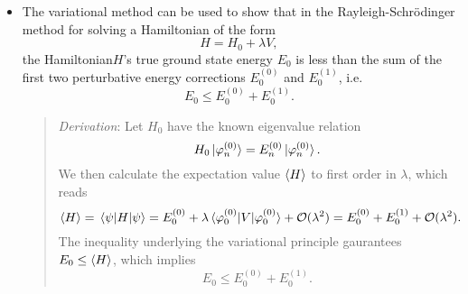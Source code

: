 \documentclass[11pt, a4paper]{article}
\newcommand{\Schro}{Schr\"{o}dinger\xspace}
\newcommand{\Ham}{Hamiltonian\xspace}
\begin{document}
\begin{itemize}
    \item The variational method can be used to show that in the Rayleigh-\Schro method for solving a \Ham of the form
    \begin{equation*}
        H = H_{0} + \lambda V,
    \end{equation*}
    the \Ham $ H $'s true ground state energy $ E_{0} $ is less than the sum of the first two perturbative energy corrections $ E_{0}^{(0)} $ and $ E_{0}^{(1)} $, i.e.
    \begin{equation*}
        E_{0} \leq E_{0}^{(0)} + E_{0}^{(1)}.
    \end{equation*}
    \begin{quote}
        \textit{Derivation}: Let $ H_{0} $ have the known eigenvalue relation
        \begin{equation*}
            H_{0} \ket*{\varphi_{n}^{(0)}} = E_{n}^{(0)}\ket*{\varphi_{n}^{(0)}}.
        \end{equation*}
        We then calculate the expectation value $ \ev{H} $ to first order in $ \lambda $, which reads
        \begin{equation*}
            \ev{H} = \mel{\psi}{H}{\psi} = E_{0}^{(0)} + \lambda \mel*{\varphi_{0}^{(0)}}{V}{\varphi_{0}^{(0)}} + \mathcal{O}(\lambda^{2}) = E_{0}^{(0)} + E_{0}^{(1)} + \mathcal{O}(\lambda^{2}).
        \end{equation*}
        The inequality underlying the variational principle gaurantees $ E_{0} \leq \ev{H} $, which implies
        \begin{equation*}
            E_{0} \leq E_{0}^{(0)} + E_{0}^{(1)}.
        \end{equation*}
    \end{quote}
\end{itemize}
\end{document}
